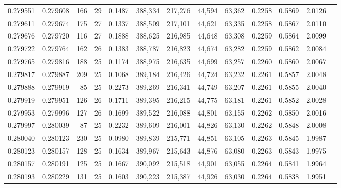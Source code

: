 \begin{tabular}{rrrrrrrrrrrrr}
0.279551 & 0.279608 &   166 &  29 &                                     0.1487 & 388,334 & 217,276 &  44,594 &  63,362 & 0.2258 & 0.5869 & 2.0126 \\
0.279611 & 0.279674 &   175 &  27 &                                     0.1337 & 388,509 & 217,101 &  44,621 &  63,335 & 0.2258 & 0.5867 & 2.0110 \\
0.279676 & 0.279720 &   116 &  27 &                                     0.1888 & 388,625 & 216,985 &  44,648 &  63,308 & 0.2259 & 0.5864 & 2.0099 \\
0.279722 & 0.279764 &   162 &  26 &                                     0.1383 & 388,787 & 216,823 &  44,674 &  63,282 & 0.2259 & 0.5862 & 2.0084 \\
0.279765 & 0.279816 &   188 &  25 &                                     0.1174 & 388,975 & 216,635 &  44,699 &  63,257 & 0.2260 & 0.5860 & 2.0067 \\
0.279817 & 0.279887 &   209 &  25 &                                     0.1068 & 389,184 & 216,426 &  44,724 &  63,232 & 0.2261 & 0.5857 & 2.0048 \\
0.279888 & 0.279919 &    85 &  25 &                                     0.2273 & 389,269 & 216,341 &  44,749 &  63,207 & 0.2261 & 0.5855 & 2.0040 \\
0.279919 & 0.279951 &   126 &  26 &                                     0.1711 & 389,395 & 216,215 &  44,775 &  63,181 & 0.2261 & 0.5852 & 2.0028 \\
0.279953 & 0.279996 &   127 &  26 &                                     0.1699 & 389,522 & 216,088 &  44,801 &  63,155 & 0.2262 & 0.5850 & 2.0016 \\
0.279997 & 0.280039 &    87 &  25 &                                     0.2232 & 389,609 & 216,001 &  44,826 &  63,130 & 0.2262 & 0.5848 & 2.0008 \\
0.280040 & 0.280123 &   230 &  25 &                                     0.0980 & 389,839 & 215,771 &  44,851 &  63,105 & 0.2263 & 0.5845 & 1.9987 \\
0.280123 & 0.280157 &   128 &  25 &                                     0.1634 & 389,967 & 215,643 &  44,876 &  63,080 & 0.2263 & 0.5843 & 1.9975 \\
0.280157 & 0.280191 &   125 &  25 &                                     0.1667 & 390,092 & 215,518 &  44,901 &  63,055 & 0.2264 & 0.5841 & 1.9964 \\
0.280193 & 0.280229 &   131 &  25 &                                     0.1603 & 390,223 & 215,387 &  44,926 &  63,030 & 0.2264 & 0.5838 & 1.9951 \\

\end{tabular}
